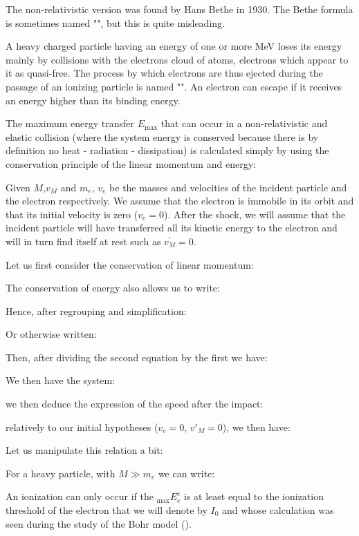 	The non-relativistic version was found by Hans Bethe in 1930. The Bethe formula is sometimes named "", but this is quite misleading.
	
	A heavy charged particle having an energy of one or more MeV loses its energy mainly by collisions with the electrons cloud of atoms, electrons which appear to it as quasi-free. The process by which electrons are thus ejected during the passage of an ionizing particle is named "". An electron can escape if it receives an energy higher than its binding energy.

	The maximum energy transfer $E_{\max}$ that can occur in a non-relativistic and elastic collision (where the system energy is conserved because there is by definition no heat - radiation - dissipation) is calculated simply by using the conservation principle of the linear momentum and energy:

	Given $M$,$v_M$ and $m_e$, $v_e$ be the masses and velocities of the incident particle and the electron respectively. We assume that the electron is immobile in its orbit and that its initial velocity is zero ($v_e=0$). After the shock, we will assume that the incident particle will have transferred all its kinetic energy to the electron and will in turn find itself at rest such as $v_M^{'}=0$.
	
	Let us first consider the conservation of linear momentum:
	
	The conservation of energy also allows us to write:
	
	Hence, after regrouping and simplification:
	
	Or otherwise written:
	
	Then, after dividing the second equation by the first we have:
	
	We then have the system:
	
	we then deduce the expression of the speed after the impact:
	
	relatively to our initial hypotheses ($v_e=0$, $v'_M=0$), we then have:
	
	Let us manipulate this relation a bit:
	
	For a heavy particle, with $M\gg m_e$ we can write:
	
	An ionization can only occur if the $_\text{max}E^e_c$ is at least equal to the ionization threshold of the electron that we will denote by $I_0$ and whose calculation was seen during the study of the Bohr model ().

